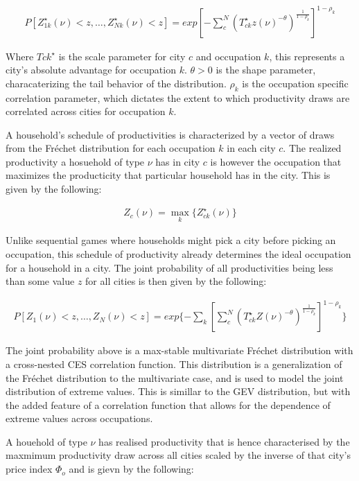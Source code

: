 \documentclass[10pt]{article}
\begin{document}
\begin{align}
    P[Z_{1k}^{\star}(\nu) < z, \dots, Z_{Nk}^{\star}(\nu) < z] = exp[-\sum_{c}^{N}(T_{ck}^{\star}z(\nu)^{-\theta})^{\frac{1}{1 - \rho_k}}]^{1 - \rho_k}
\end{align}

Where $T{ck}^{\star}$ is the scale parameter for city $c$ and occupation $k$, this represents a city's absolute advantage for occupation $k$. $\theta > 0$ is the shape parameter, characaterizing the tail behavior of the distribution. $\rho_k$ is the occupation specific correlation parameter, which dictates the extent to which productivity draws are correlated across cities for occupation $k$.

A household's schedule of productivities is characterized by a vector of draws from the Fréchet distribution for each occupation $k$ in each city $c$. The realized productivity a hosuehold of type $\nu$ has in city $c$ is however the occupation that maximizes the producticity that particular household has in the city. This is given by the following:

\begin{align}
    Z_c(\nu) = \max_{k} \{Z_{ck}^{\star}(\nu)\}
\end{align}

Unlike sequential games where households might pick a city before picking an occupation, this schedule of productivity already determines the ideal occupation for a household in a city. The joint probability of all productivities being less than some value $z$ for all cities is then given by the following:

\begin{align}
    P[Z_1(\nu) < z, \dots, Z_N(\nu) < z] = exp\{- \sum_{k}^{}[\sum_{c}^{N}(T_{ck}^{\star} Z(\nu)^{-\theta})^{\frac{1}{1 - \rho_k}}]^{1 - \rho_k}\}
\end{align}

The joint probability above is a max-stable multivariate Fréchet distribution with a cross-nested CES correlation function. This distribution is a generalization of the Fréchet distribution to the multivariate case, and is used to model the joint distribution of extreme values. This is simillar to the GEV distribution, but with the added feature of a correlation function that allows for the dependence of extreme values across occupations.

A houehold of type $\nu$ has realised productivity that is hence characterised by the maxmimum productivity draw across all cities scaled by the inverse of that city's price index $\Phi_o$ and is gievn by the following:
\end{document}
